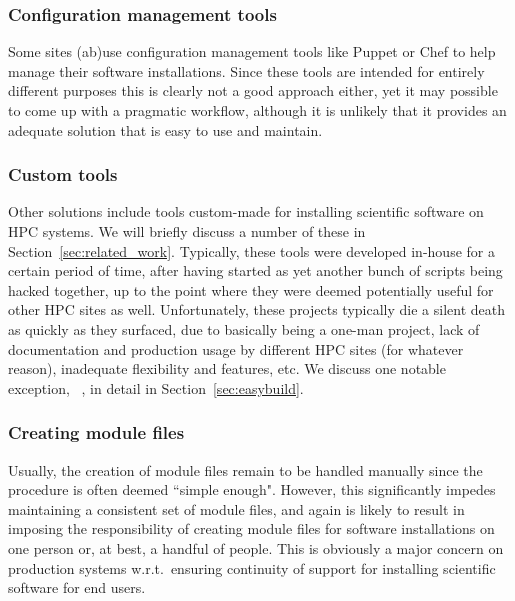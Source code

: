 \subsubsection{Configuration management tools}

Some sites (ab)use configuration management tools like Puppet or Chef to help manage
their software installations. Since these tools are intended for entirely different
purposes this is clearly not a good approach either, yet it may possible to come up
with a pragmatic workflow, although it is unlikely that it provides an adequate
solution that is easy to use and maintain.

\subsubsection{Custom tools}

Other solutions include tools custom-made for installing scientific software
on HPC systems. We will briefly discuss a number of these in
Section~\ref{sec:related_work}. Typically, these tools were developed in-house for
a certain period of time, after having started as yet another bunch of
scripts being hacked together, up to the point where they were deemed potentially
useful for other HPC sites as well. Unfortunately, these projects typically die a
silent death as quickly as they surfaced, due to basically being a one-man project,
lack of documentation and production usage by different HPC sites (for whatever
reason), inadequate flexibility and features, etc. We discuss one notable 
exception, \easybuild{}~\cite{EasyBuildSC12}, in detail in
Section~\ref{sec:easybuild}.

\subsubsection{Creating module files}

Usually, the creation of module files remain to be handled manually since the
procedure is often deemed ``simple enough". However, this significantly impedes
maintaining a consistent set of module files, and again is likely to result in
imposing the responsibility of creating module files for software installations
on one person or, at best, a handful of people. This is obviously a major concern
on production systems w.r.t.~ensuring continuity of support for installing
scientific software for end users.

